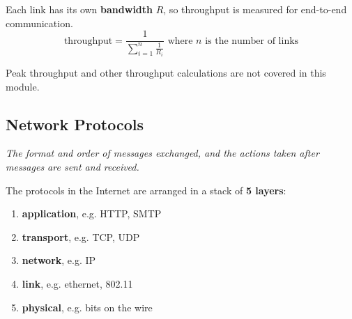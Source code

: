 Each link has its own \textbf{bandwidth} $R$, so throughput is measured for end-to-end communication.\\
\begin{equation*}
    \text{throughput} = \frac{1}{\sum_{i=1}^{n} \frac{1}{R_{i}}} \text{ where $n$ is the number of links}
\end{equation*}

Peak throughput and other throughput calculations are not covered in this module.

\subsection{Network Protocols}
\emph{The format and order of messages exchanged, and the actions taken after messages are sent and received.}

The protocols in the Internet are arranged in a stack of \textbf{5 layers}:
\begin{enumerate}
    \item \textbf{application}, e.g. HTTP, SMTP
    \item \textbf{transport}, e.g. TCP, UDP
    \item \textbf{network}, e.g. IP
    \item \textbf{link}, e.g. ethernet, 802.11
    \item \textbf{physical}, e.g. bits on the wire
\end{enumerate}